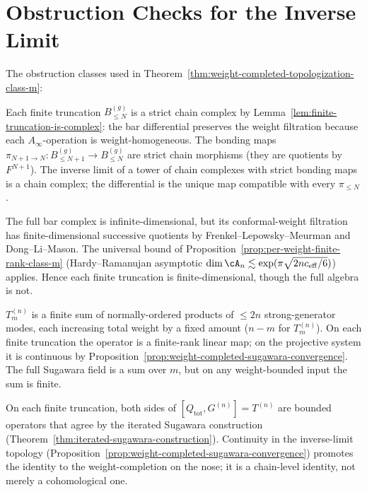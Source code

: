 \section{Obstruction Checks for the Inverse Limit}
\label{sec:weight-completed-topologization-obstruction-checks}

The obstruction classes used in
Theorem~\ref{thm:weight-completed-topologization-class-m}:

\begin{remark}
\label{rem:weight-completion-differential}
Each finite truncation $B^{(g)}_{\le N}$ is a strict chain
complex by Lemma~\ref{lem:finite-truncation-is-complex}: the bar
differential preserves the weight filtration because each $A_\infty$-operation
is weight-homogeneous. The bonding maps
$\pi_{N + 1 \to N} \colon B^{(g)}_{\le N + 1} \to B^{(g)}_{\le N}$ are
strict chain morphisms (they are quotients by $F^{N + 1}$). The
inverse limit of a tower of chain complexes with strict bonding maps
is a chain complex; the differential is the unique map compatible with
every $\pi_{\le N}$.
\end{remark}

\begin{remark}
\label{rem:weight-completed-per-weight-finite-rank}
The full bar complex is infinite-dimensional, but its
conformal-weight filtration has finite-dimensional successive
quotients by Frenkel--Lepowsky--Meurman and Dong--Li--Mason. The
universal bound of
Proposition~\ref{prop:per-weight-finite-rank-class-m} (Hardy--Ramanujan
asymptotic $\dim \cA_n \lesssim \exp(\pi \sqrt{2 n c_{\mathrm{eff}}/6})$)
applies. Hence each finite truncation is finite-dimensional, though
the full algebra is not.
\end{remark}

\begin{remark}
\label{rem:weight-completed-sugawara-convergence-check}
$T^{(n)}_m$ is a finite sum of normally-ordered products
of $\le 2n$ strong-generator modes, each increasing total weight by a
fixed amount ($n - m$ for $T^{(n)}_m$). On each finite truncation the
operator is a finite-rank linear map; on the projective system it is
continuous by
Proposition~\ref{prop:weight-completed-sugawara-convergence}. The
full Sugawara field is a sum over $m$, but on any weight-bounded
input the sum is finite.
\end{remark}

\begin{remark}
\label{rem:weight-completed-Q-tot-chain-identity}
On each finite truncation, both sides of
$[Q_{\mathrm{tot}},G^{(n)}]=T^{(n)}$ are bounded operators
that agree by the iterated Sugawara construction
(Theorem~\ref{thm:iterated-sugawara-construction}). Continuity in the
inverse-limit topology
(Proposition~\ref{prop:weight-completed-sugawara-convergence}) promotes
the identity to the weight-completion on the nose; it is a
chain-level identity, not merely a cohomological one.
\end{remark}

